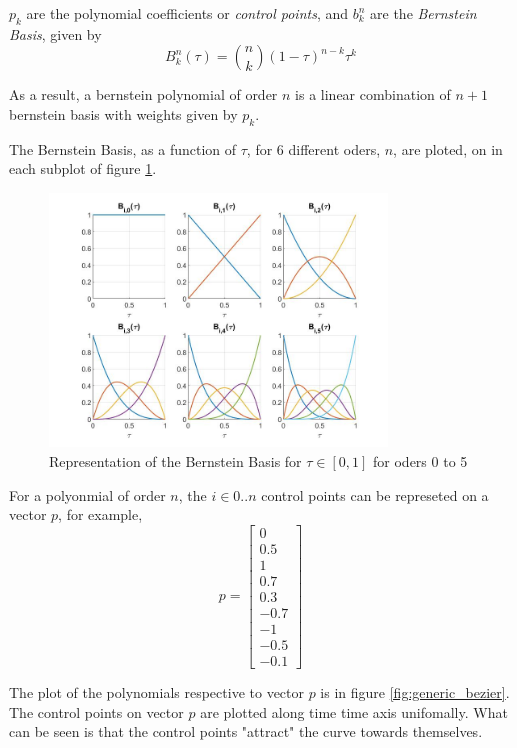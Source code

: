\par $p_k$ are the polynomial coefficients or \textit{control points}, and $b_k^n$ are the \textit{Bernstein Basis}, given by 
\begin{equation}
	B^n_k {(\tau)} = \binom{n}{k} {(1 - \tau)}^{n-k} \tau^k
    \label{eq:bern_basis}
\end{equation}
\par As a result, a bernstein polynomial of order $n$ is a linear combination of $n+1$ bernstein basis with weights given by $p_k$.

\par The Bernstein Basis, as a function of $\tau$, for 6 different oders, $n$, are ploted, on in each subplot of figure \ref{fig:bernsteinbasis}.

\begin{figure}[h!]
\centering
\includegraphics[width=0.8\textwidth]{Images/bernstein_basis.jpg}
\caption{Representation of the Bernstein Basis for $\tau \in [0,1]$ for oders 0 to 5}
\label{fig:bernsteinbasis}
\end{figure}

\par For a polyonmial of order $n$, the $i \in {0 .. n}$ control points can be represeted on a vector $p$, for example,
\begin{equation}
    p = \begin{bmatrix}0\\ 0.5\\ 1\\ 0.7\\ 0.3\\ -0.7\\ -1\\ -0.5\\ -0.1\end{bmatrix}
\end{equation}
\par The plot of the polynomials respective to vector $p$ is in figure \ref{fig:generic_bezier}. The control points on vector $p$ are plotted along time time axis unifomally. What can be seen is that the control points "attract" the curve towards themselves.


